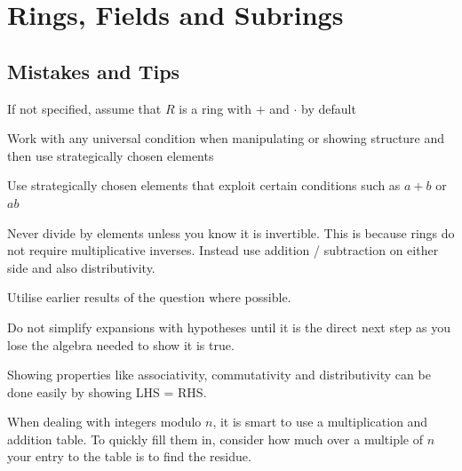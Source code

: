 \section{Rings, Fields and Subrings}

\subsection{Mistakes and Tips}

\begin{mistake}
  If not specified, assume that $R$ is a ring with $+$ and $\cdot$ by default
\end{mistake}

\begin{mistake}

  Work with any universal condition when manipulating or showing structure and then use strategically chosen elements
  
\end{mistake}

\begin{mistake}
  Use strategically chosen elements that exploit certain conditions such as $a+b$ or $ab$
\end{mistake}

\begin{mistake}
  Never divide by elements unless you know it is invertible. This is because rings do not require multiplicative inverses. Instead use addition / subtraction on either side and also distributivity.
\end{mistake}

\begin{mistake}
  Utilise earlier results of the question where possible.
\end{mistake}


\begin{mistake}
  Do not simplify expansions with hypotheses until it is the direct next step as you lose the algebra needed to show it is true.
\end{mistake}

\begin{mistake}
  Showing properties like associativity, commutativity and distributivity can be done easily by showing LHS = RHS.
\end{mistake}

\begin{mistake}
  When dealing with integers modulo $n$, it is smart to use a multiplication and addition table. To quickly fill them in, consider how much over a multiple of $n$ your entry to the table is to find the residue.
\end{mistake}

